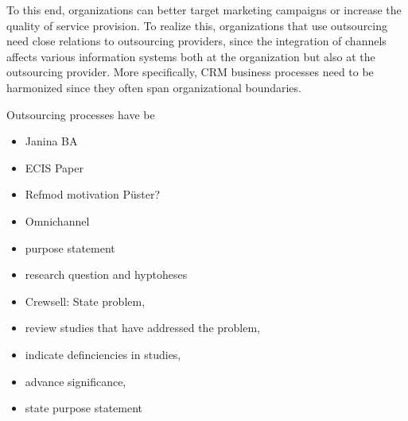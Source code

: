 To this end, organizations can better target marketing campaigns or increase the quality of service provision. To realize this, organizations that use outsourcing need close relations to outsourcing providers, since the integration of channels affects various information systems both at the organization but also at the outsourcing provider. More specifically, CRM business processes need to be harmonized since they often span organizational boundaries.


 

Outsourcing processes have be



	\begin{itemize}
		\item Janina BA
		\item ECIS Paper
		\item Refmod motivation Püster?
		\item Omnichannel 
		\item purpose statement
		\item research question and hyptoheses
	\end{itemize}

	\begin{itemize}
		\item Crewsell: State problem, 
		\item review studies that have addressed the problem,
		\item  indicate definciencies in studies, 
		\item advance significance, 
		\item state purpose statement
	\end{itemize}
